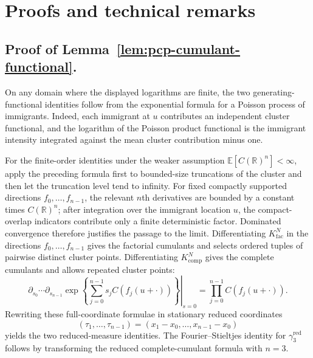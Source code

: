 \documentclass[aap,press]{apt} \volno{00} \partno{00}
\newcommand{\E}{\mathbb{E}}
\newcommand{\R}{\mathbb{R}}
\newcommand{\1}{\mathbf{1}}
\numberwithin{equation}{section}
\begin{document}
\appendix
\section{Proofs and technical remarks}

\subsection{Proof of Lemma~\ref{lem:pcp-cumulant-functional}.}
On any domain where the displayed logarithms are finite, the two generating-functional identities follow from the exponential formula for a Poisson process of immigrants. Indeed, each immigrant at $u$ contributes an independent cluster functional, and the logarithm of the Poisson product functional is the immigrant intensity integrated against the mean cluster contribution minus one.

For the finite-order identities under the weaker assumption $\E[C(\R)^n]<\infty$, apply the preceding formula first to bounded-size truncations of the cluster and then let the truncation level tend to infinity. For fixed compactly supported directions $f_0,\ldots,f_{n-1}$, the relevant $n$th derivatives are bounded by a constant times $C(\R)^n$; after integration over the immigrant location $u$, the compact-overlap indicators contribute only a finite deterministic factor. Dominated convergence therefore justifies the passage to the limit. Differentiating $K_{\mathrm{fac}}^N$ in the directions $f_0,\ldots,f_{n-1}$ gives the factorial cumulants and selects ordered tuples of pairwise distinct cluster points. Differentiating $K_{\mathrm{comp}}^N$ gives the complete cumulants and allows repeated cluster points:
\[
\left.\partial_{s_0}\cdots\partial_{s_{n-1}}
\exp\left\{\sum_{j=0}^{n-1}s_jC(f_j(u+\cdot))\right\}\right|_{s=0}
=
\prod_{j=0}^{n-1}C(f_j(u+\cdot)).
\]
Rewriting these full-coordinate formulae in stationary reduced coordinates
\[
(\tau_1,\ldots,\tau_{n-1})=(x_1-x_0,\ldots,x_{n-1}-x_0)
\]
yields the two reduced-measure identities. The Fourier--Stieltjes identity for $\gamma_3^{\mathrm{red}}$ follows by transforming the reduced complete-cumulant formula with $n=3$.
\end{document}
